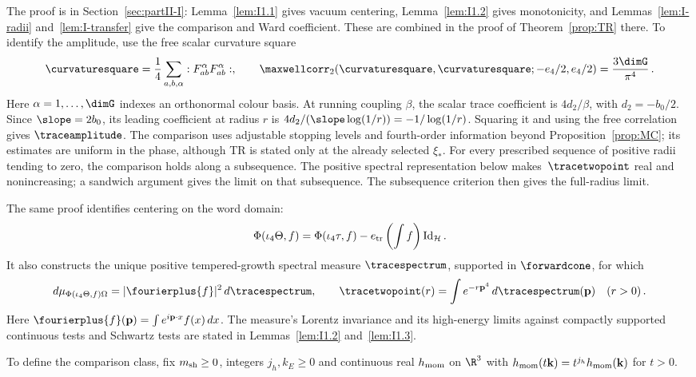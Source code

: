 The proof is in Section~\ref{sec:partII-I}: Lemma~\ref{lem:I1.1} gives vacuum centering, Lemma~\ref{lem:I1.2} gives monotonicity, and Lemmas~\ref{lem:I-radii} and~\ref{lem:I-transfer} give the comparison and Ward coefficient. These are combined in the proof of Theorem~\ref{prop:TR} there. To identify the amplitude, use the free scalar curvature square
\begin{equation*}
\curvaturesquare=\frac14\sum_{a,b,\alpha}:F_{ab}^{\alpha}F_{ab}^{\alpha}:,\qquad
\maxwellcorr_2(\curvaturesquare,\curvaturesquare;-e_4/2,e_4/2)=\frac{3\dimG}{\pi^4}\,.
\end{equation*}
Here $\alpha=1,\ldots,\dimG$ indexes an orthonormal colour basis. At running coupling $\beta$, the scalar trace coefficient is $4d_2/\beta$, with $d_2=-b_0/2$. Since $\slope=2b_0$, its leading coefficient at radius $r$ is $4d_2/(\slope\log(1/r))=-1/\log(1/r)$. Squaring it and using the free correlation gives $\traceamplitude$. The comparison uses adjustable stopping levels and fourth-order information beyond Proposition~\ref{prop:MC}; its estimates are uniform in the phase, although TR is stated only at the already selected $\xi_*$. For every prescribed sequence of positive radii tending to zero, the comparison holds along a subsequence. The positive spectral representation below makes~$\tracetwopoint$ real and nonincreasing; a sandwich argument gives the limit on that subsequence. The subsequence criterion then gives the full-radius limit.

The same proof identifies centering on the word domain:
\begin{equation*}
\Phi(\iota_4\Theta,f)=\Phi(\iota_4\tau,f)-e_{\rm tr}\left(\int f\right)\mathrm{Id}_{\mathcal H}\,.
\end{equation*}
It also constructs the unique positive tempered-growth spectral measure $\tracespectrum$, supported in $\forwardcone$, for which
\begin{equation*}
d\mu_{\Phi(\iota_4\Theta,f)\Omega}=|\fourierplus{f}|^2\,d\tracespectrum,\qquad \tracetwopoint(r)=\int e^{-r\mathbf p^4}\,d\tracespectrum(\mathbf p)\quad(r>0)\,.
\end{equation*}
Here $\fourierplus{f}(\mathbf p)=\int e^{i\mathbf p\cdot x}f(x)\,dx$. The measure's Lorentz invariance and its high-energy limits against compactly supported continuous tests and Schwartz tests are stated in Lemmas~\ref{lem:I1.2} and~\ref{lem:I1.3}.

To define the comparison class, fix $m_{\rm sh}\ge0$, integers $j_h,k_E\ge0$ and continuous real $h_{\rm mom}$ on $\R^3$ with $h_{\rm mom}(t\mathbf k)=t^{j_h}h_{\rm mom}(\mathbf k)$ for $t>0$.

